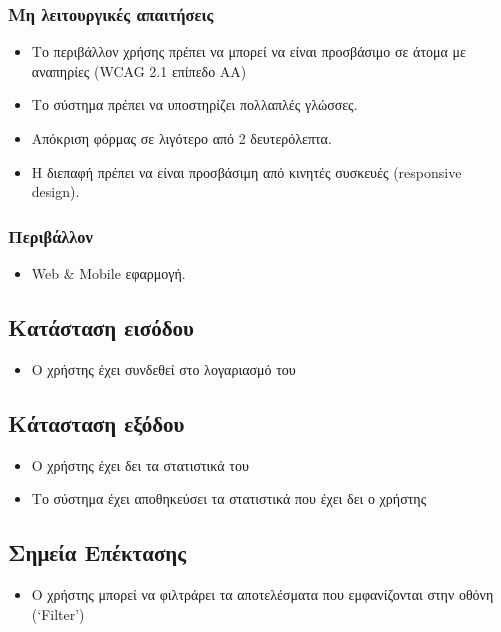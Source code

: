 \documentclass[12pt,a4paper,twoside]{book}
\begin{document}
\subsubsection{Μη λειτουργικές απαιτήσεις}
\begin{itemize}
  \item Το περιβάλλον χρήσης πρέπει να μπορεί να  είναι προσβάσιμο σε  άτομα με αναπηρίες (WCAG 2.1 επίπεδο AA) %
  \item Το σύστημα πρέπει να υποστηρίζει πολλαπλές γλώσσες.
  \item Απόκριση φόρμας σε λιγότερο από 2 δευτερόλεπτα. %
  \item Η διεπαφή πρέπει να είναι προσβάσιμη από κινητές συσκευές (responsive design). %
\end{itemize}

\subsubsection{Περιβάλλον}
\begin{itemize}
  \item Web \& Mobile εφαρμογή.
\end{itemize}

\subsection{Κατάσταση εισόδου} %
\begin{itemize}
  \item Ο χρήστης έχει συνδεθεί στο λογαριασμό του %
\end{itemize}

\subsection{Κάτασταση εξόδου} %
\begin{itemize}
  \item Ο χρήστης έχει δει τα στατιστικά του %
  \item Το σύστημα έχει αποθηκεύσει τα στατιστικά που έχει δει ο χρήστης %
\end{itemize}

\subsection{Σημεία Επέκτασης}
\begin{itemize}
  \item Ο χρήστης μπορεί να φιλτράρει τα αποτελέσματα που εμφανίζονται στην οθόνη (`Filter') %
\end{itemize}
\end{document}
